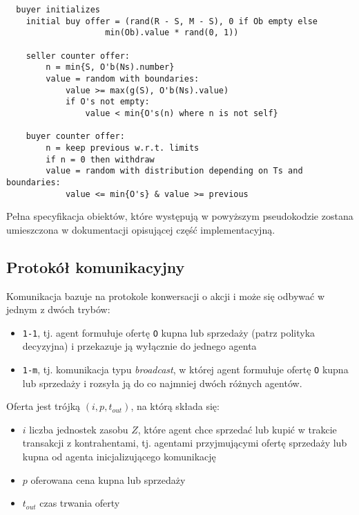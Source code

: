 \documentclass[]{article}
\providecommand{\tightlist}{%
  \setlength{\itemsep}{0pt}\setlength{\parskip}{0pt}}
\begin{document}
\begin{verbatim}
  buyer initializes
    initial buy offer = (rand(R - S, M - S), 0 if Ob empty else
                    min(Ob).value * rand(0, 1))
   
    seller counter offer:
        n = min{S, O'b(Ns).number}
        value = random with boundaries:
            value >= max(g(S), O'b(Ns).value)
            if O's not empty:
                value < min{O's(n) where n is not self}

    buyer counter offer:
        n = keep previous w.r.t. limits
        if n = 0 then withdraw
        value = random with distribution depending on Ts and boundaries:
            value <= min{O's} & value >= previous
\end{verbatim}

Pełna specyfikacja obiektów, które występują w powyższym pseudokodzie
zostana umieszczona w dokumentacji opisującej część implementacyjną.

\hypertarget{protokuxf3ux142-komunikacyjny}{%
\subsection{Protokół
komunikacyjny}\label{protokuxf3ux142-komunikacyjny}}

Komunikacja bazuje na protokole konwersacji o akcji i może się odbywać w jednym z dwóch trybów:

\begin{itemize}
\tightlist
\item
  \texttt{1-1}, tj. agent formułuje ofertę \texttt{O} kupna lub
  sprzedaży (patrz polityka decyzyjna) i przekazuje ją wyłącznie do
  jednego agenta
\item
  \texttt{1-m}, tj. komunikacja typu \emph{broadcast}, w której agent
  formułuje ofertę \texttt{O} kupna lub sprzedaży i rozsyła ją do co
  najmniej dwóch różnych agentów.
\end{itemize}

Oferta jest trójką \((i, p, t_{out})\), na którą składa się:

\begin{itemize}
\tightlist
\item
  \(i\) liczba jednostek zasobu \(Z\), które agent chce sprzedać lub
  kupić w trakcie transakcji z kontrahentami, tj. agentami przyjmującymi
  ofertę sprzedaży lub kupna od agenta inicjalizującego komunikację
\item
  \(p\) oferowana cena kupna lub sprzedaży
\item
  \(t_{out}\) czas trwania oferty
\end{itemize}
\end{document}
